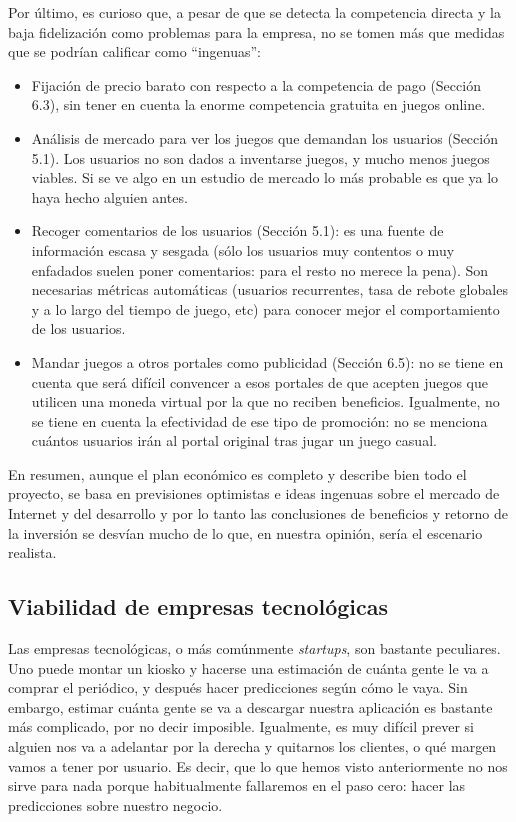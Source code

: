 \documentclass[nochap,palatino,shortheader]{apuntes}
\begin{document}
Por último, es curioso que, a pesar de que se detecta la competencia directa y la baja fidelización como problemas para la empresa, no se tomen más que medidas que se podrían calificar como ``ingenuas'':

\begin{itemize}
\item Fijación de precio barato con respecto a la competencia de pago (Sección 6.3), sin tener en cuenta la enorme competencia gratuita en juegos online.
\item Análisis de mercado para ver los juegos que demandan los usuarios (Sección 5.1). Los usuarios no son dados a inventarse juegos, y mucho menos juegos viables. Si se ve algo en un estudio de mercado lo más probable es que ya lo haya hecho alguien antes.
\item Recoger comentarios de los usuarios (Sección 5.1): es una fuente de información escasa y sesgada (sólo los usuarios muy contentos o muy enfadados suelen poner comentarios: para el resto no merece la pena). Son necesarias métricas automáticas (usuarios recurrentes, tasa de rebote globales y a lo largo del tiempo de juego, etc) para conocer mejor el comportamiento de los usuarios.
\item Mandar juegos a otros portales como publicidad (Sección 6.5): no se tiene en cuenta que será difícil convencer a esos portales de que acepten juegos que utilicen una moneda virtual por la que no reciben beneficios. Igualmente, no se tiene en cuenta la efectividad de ese tipo de promoción: no se menciona cuántos usuarios irán al portal original tras jugar un juego casual.
\end{itemize}

En resumen, aunque el plan económico es completo y describe bien todo el proyecto, se basa en previsiones optimistas e ideas ingenuas sobre el mercado de Internet y del desarrollo y por lo tanto las conclusiones de beneficios y retorno de la inversión se desvían mucho de lo que, en nuestra opinión, sería el escenario realista.

\subsection{Viabilidad de empresas tecnológicas}

Las empresas tecnológicas, o más comúnmente \textit{startups}, son bastante peculiares. Uno puede montar un kiosko y hacerse una estimación de cuánta gente le va a comprar el periódico, y después hacer predicciones según cómo le vaya. Sin embargo, estimar cuánta gente se va a descargar nuestra aplicación es bastante más complicado, por no decir imposible. Igualmente, es muy difícil prever si alguien nos va a adelantar por la derecha y quitarnos los clientes, o qué margen vamos a tener por usuario. Es decir, que lo que hemos visto anteriormente no nos sirve para nada porque habitualmente fallaremos en el paso cero: hacer las predicciones sobre nuestro negocio.
\end{document}
